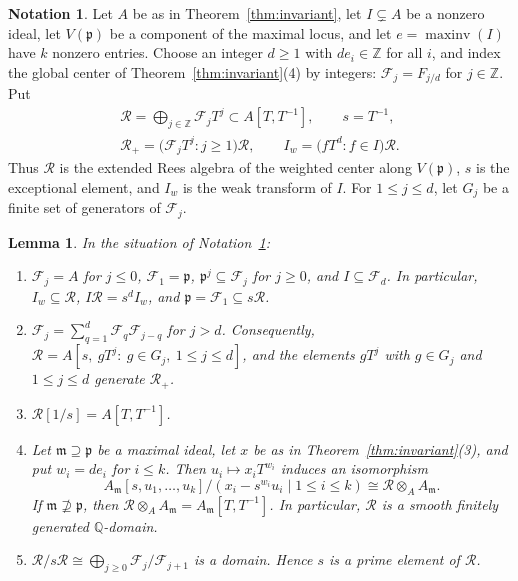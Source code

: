 \documentclass[11pt]{amsart}
\numberwithin{equation}{section}
\newtheorem{lemma}[theorem]{Lemma}
\theoremstyle{definition}
\newtheorem{notation}[theorem]{Notation}
\newcommand{\Q}{\mathbb{Q}}
\newcommand{\Z}{\mathbb{Z}}
\newcommand{\fm}{\mathfrak{m}}
\newcommand{\fp}{\mathfrak{p}}
\newcommand{\cF}{\mathcal{F}}
\newcommand{\cR}{\mathcal{R}}
\DeclareMathOperator{\maxinv}{maxinv}
\begin{document}
\begin{notation}\label{not:rees}
Let $A$ be as in Theorem~\ref{thm:invariant}, let $I\subsetneq A$ be a nonzero ideal, let $V(\fp)$ be a component of the maximal locus, and let $e=\maxinv(I)$ have $k$ nonzero entries. Choose an integer $d\ge1$ with $de_i\in\Z$ for all $i$, and index the global center of Theorem~\ref{thm:invariant}(4) by integers: $\cF_j=F_{j/d}$ for $j\in\Z$. Put
\begin{gather*}
  \cR=\bigoplus_{j\in\Z}\cF_jT^j\subset A[T,T^{-1}],\qquad s=T^{-1},\\
  \cR_+=\bigl(\cF_jT^j:j\ge1\bigr)\cR,\qquad
  I_w=\bigl(fT^d:f\in I\bigr)\cR.
\end{gather*}
Thus $\cR$ is the extended Rees algebra of the weighted center along $V(\fp)$, $s$ is the exceptional element, and $I_w$ is the weak transform of $I$. For $1\le j\le d$, let $G_j$ be a finite set of generators of $\cF_j$.
\end{notation}

\begin{lemma}\label{lem:rees}
In the situation of Notation~\ref{not:rees}:
\begin{enumerate}
\item $\cF_j=A$ for $j\le0$, $\cF_1=\fp$, $\fp^j\subseteq\cF_j$ for $j\ge0$, and $I\subseteq\cF_d$. In particular, $I_w\subseteq \cR$, $I\cR=s^dI_w$, and $\fp=\cF_1\subseteq s\cR$.
\item $\cF_j=\sum_{q=1}^d\cF_q\cF_{j-q}$ for $j>d$. Consequently, $\cR=A[s,\ gT^j:\ g\in G_j,\ 1\le j\le d]$, and the elements $gT^j$ with $g\in G_j$ and $1\le j\le d$ generate $\cR_+$.
\item $\cR[1/s]=A[T,T^{-1}]$.
\item Let $\fm\supseteq\fp$ be a maximal ideal, let $x$ be as in Theorem~\ref{thm:invariant}(3), and put $w_i=de_i$ for $i\le k$. Then $u_i\mapsto x_iT^{w_i}$ induces an isomorphism
\[
  A_\fm[s,u_1,\ldots,u_k]/(x_i-s^{w_i}u_i\mid1\le i\le k)\cong \cR\otimes_AA_\fm.
\]
If $\fm\not\supseteq\fp$, then $\cR\otimes_AA_\fm=A_\fm[T,T^{-1}]$. In particular, $\cR$ is a smooth finitely generated $\Q$-domain.
\item $\cR/s\cR\cong\bigoplus_{j\ge0}\cF_j/\cF_{j+1}$ is a domain. Hence $s$ is a prime element of $\cR$.
\end{enumerate}
\end{lemma}
\end{document}
